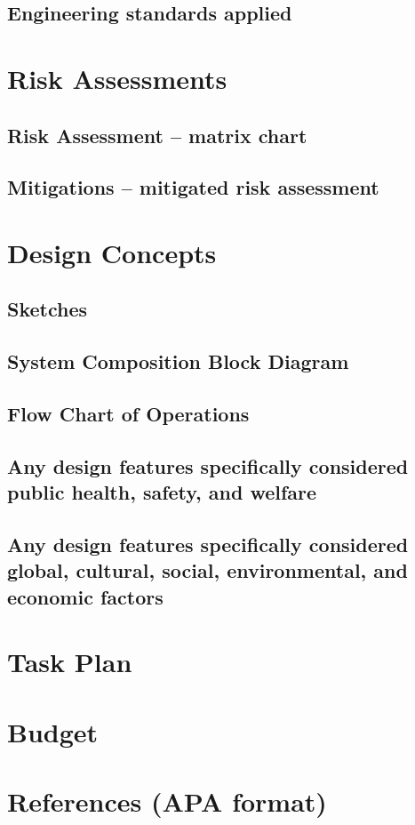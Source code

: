\documentclass[a4paper,10pt]{article}
\begin{document}
    \subsection{Engineering standards applied}
\section{Risk Assessments}
    \subsection{Risk Assessment – matrix chart}
    \subsection{Mitigations – mitigated risk assessment}
\section{Design Concepts}
    \subsection{Sketches}
    \subsection{System Composition Block Diagram}
    \subsection{Flow Chart of Operations}
    \subsection{Any design features specifically  considered public health, safety, and welfare}
    \subsection{Any design features specifically  considered global, cultural, social, environmental, and economic factors}
\section{Task Plan}

\section{Budget}

\section{References (APA format)}
\end{document}
